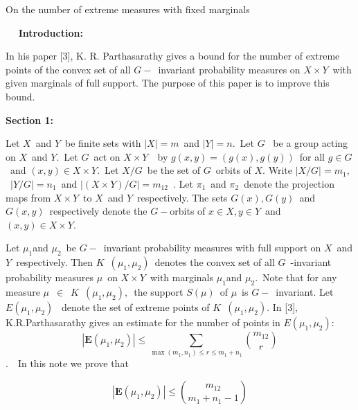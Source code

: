 \documentclass{article}
\begin{document}
\begin{center}
{\Huge On the number of extreme measures with fixed marginals}


\bigskip
\end{center}


{\large {\ }} {\large {\ \textbf{Introduction:} }}

{\large \bigskip }

{\large In his paper [3], K. R. Parthasarathy gives a bound for the number
of extreme points of the convex set of all $G-$\ invariant probability
measures on $X\times Y$\ with given marginals of full support. The purpose
of this paper is to improve this bound. }

{\large \bigskip }

{\large \textbf{Section 1:} }

{\large \bigskip }

{\large Let $X$\ and $Y$\ be finite sets with $|X|=m$\ and $|Y|=n.$\ Let $G$%
\ be a group acting on $X$\ and $Y.$\ Let $G$\ act on $X\times Y$\ \ by $%
g(x,y)=(g(x),g(y))$\ for all $g\in G$\ and $(x,y)\in X\times Y.$\ Let $X/G$\
be the set of $G$\ orbits of $X$. Write $|X/G|=m_{1},$\ $|Y/G|= n_{1}$\ and $%
|(X\times Y)/G|= m_{12}$\ . Let $\pi _{1}$\ and $\pi _{2}$\ denote the
projection maps from $X\times Y$\ to $X$\ and $Y$\ respectively. The sets $%
G(x),G(y)$\ and $G(x,y)$\ respectively denote the $G-$orbits of $x\in X,y\in
Y$\ and $(x,y)\in X\times Y.$ }

{\large Let $\mu _{1}$and $\mu _{2}$\ be $G-$\ invariant probability
measures with full support on $X$\ and $Y$\ respectively. Then $K$\ $(\mu
_{1},\mu _{2})$\ denotes the convex set of all $G$\ -invariant probability
measures $\mu $\ on $X\times Y$\ with marginals $\mu _{1}$and $\mu _{2}.$\
Note that for any measure $\mu $\ $\in $\ $K$\ $(\mu _{1},\mu _{2}),$\ the
support $S(\mu )$\ of $\mu $\ is $G-$\ invariant. Let $E(\mu _{1},\mu _{2})$%
\ denote the set of extreme points of $K$\ $(\mu _{1},\mu _{2})$. In [3],
K.R.Parthasarathy gives an estimate for the number of points in $E(\mu
_{1},\mu _{2}):$\
\begin{equation*}
|\mathbf{E}(\mu _{1},\mu _{2})|\leq \sum_{\max (m_{1},n_{1})\leq r\leq
m_{1}+n_{1}}\binom{m_{12}}{r}
\end{equation*}
$.$\ \ In this note we prove that }

{\large
\begin{equation}
|\mathbf{E}(\mu _{1},\mu _{2})|\leq \binom{m_{12}}{m_{1}+n_{1}-1}  \tag{1}
\end{equation}
}
\end{document}
